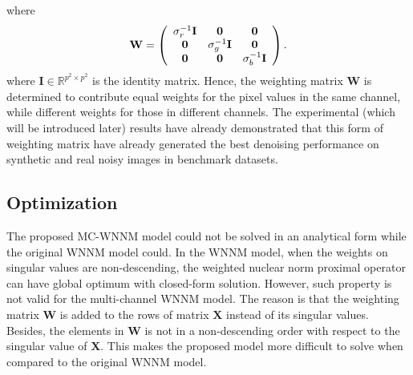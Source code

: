 \documentclass[10pt,twocolumn,letterpaper,sort&compress]{article}
\begin{document}
where
\begin{equation}
\label{e9}
\vspace{-1mm}
\mathbf{W}
=
\left( \begin{array}{ccc}
\sigma_{r}^{-1}\mathbf{I} & \mathbf{0} & \mathbf{0}
\\
\mathbf{0} & \sigma_{g}^{-1}\mathbf{I} & \mathbf{0}
\\
\mathbf{0} & \mathbf{0} & \sigma_{b}^{-1}\mathbf{I}
\end{array} \right).
\end{equation}
where $\mathbf{I}
\in\mathbb{R}^{p^{2}\times p^{2}}$ is the identity matrix. Hence, the weighting matrix $\mathbf{W}$ is determined to contribute equal weights for the pixel values in the same channel, while different weights for those in different channels. The experimental (which will be introduced later) results have already demonstrated that this form of weighting matrix have already generated the best denoising performance on synthetic and real noisy images in benchmark datasets.

\subsection{Optimization}
The proposed MC-WNNM model could not be solved in an analytical form while the original WNNM model \cite{wnnmijcv} could. In the WNNM model, when the weights on singular values are non-descending, the weighted nuclear norm proximal operator \cite{wnnmijcv} can have global optimum with closed-form solution. However, such property is not valid for the multi-channel WNNM model. The reason is that the weighting matrix $\mathbf{W}$ is added to the rows of matrix $\mathbf{X}$ instead of its singular values. Besides, the elements in $\mathbf{W}$ is not in a non-descending order with respect to the singular value of $\mathbf{X}$. This makes the proposed model more difficult to solve when compared to the original WNNM model.
\end{document}
